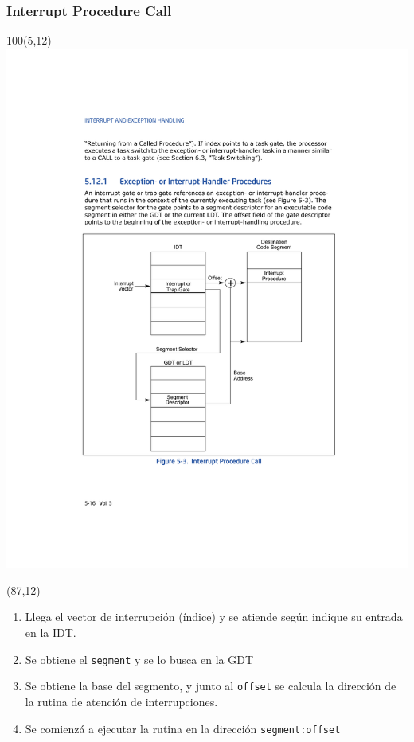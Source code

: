 \documentclass[aspectratio=169]{beamer}
\begin{document}
\begin{frame}
    \frametitle{Interrupt Procedure Call}
    \begin{textblock}{100}(5,12)
            \includegraphics[scale=0.60]{img/procedure_call} 
    \end{textblock}
    \begin{textblock}{70}(87,12)
        \begin{enumerate}
        \small
        \setlength\itemsep{0.4cm}
        \item<2->[-] Llega el vector de interrupción (índice) y se atiende según indique su entrada en la IDT.
        \item<3->[-] Se obtiene el \textcolor{verdeuca}{\texttt{segment}} y se lo busca en la GDT
        \item<4->[-] Se obtiene la base del segmento, y junto al \textcolor{verdeuca}{\texttt{offset}} se calcula la dirección de la rutina de atención de interrupciones.
        \item<5->[-] Se comienzá a ejecutar la rutina en la dirección \textcolor{verdeuca}{\texttt{segment:offset}}
        \end{enumerate}
    \end{textblock}
\end{frame}
\end{document}
